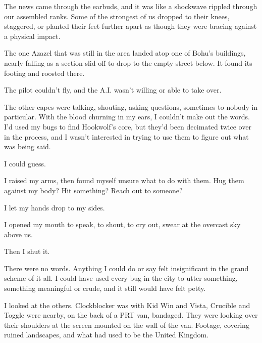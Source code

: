 





The news came through the earbuds, and it was like a shockwave rippled through our assembled ranks.  Some of the strongest of us dropped to their knees, staggered, or planted their feet further apart as though they were bracing against a physical impact.



The one Azazel that was still in the area landed atop one of Bohu's buildings, nearly falling as a section slid off to drop to the empty street below.  It found its footing and roosted there.



The pilot couldn't fly, and the A.I. wasn't willing or able to take over.



The other capes were talking, shouting, asking questions, sometimes to nobody in particular.  With the blood churning in my ears, I couldn't make out the words.  I'd used my bugs to find Hookwolf's core, but they'd been decimated twice over in the process, and I wasn't interested in trying to use them to figure out what was being said.



I could guess.



I raised my arms, then found myself unsure what to do with them.  Hug them against my body?  Hit something?  Reach out to someone?



I let my hands drop to my sides.



I opened my mouth to speak, to shout, to cry out, swear at the overcast sky above us.



Then I shut it.



There were no words.  Anything I could do or say felt insignificant in the grand scheme of it all.  I could have used every bug in the city to utter something, something meaningful or crude, and it still would have felt petty.



I looked at the others.  Clockblocker was with Kid Win and Vista, Crucible and Toggle were nearby, on the back of a PRT van, bandaged.  They were looking over their shoulders at the screen mounted on the wall of the van.  Footage, covering ruined landscapes, and what had used to be the United Kingdom.



